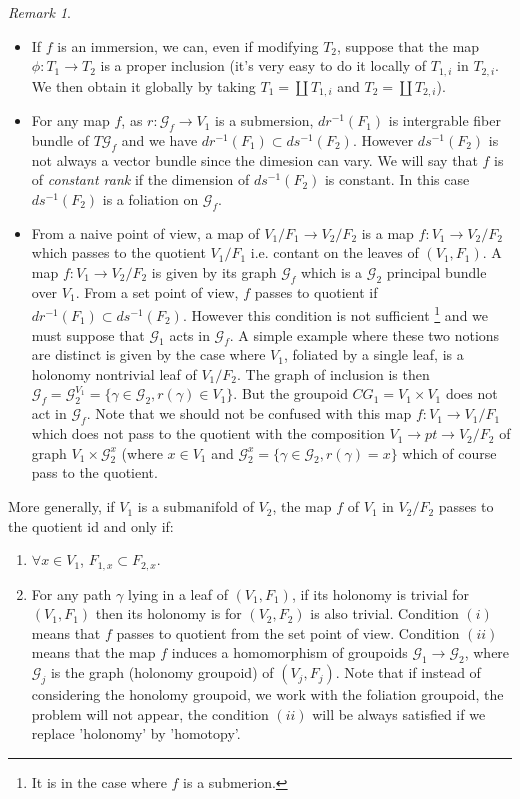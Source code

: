 \documentclass[12pt]{amsart}
\theoremstyle{definition}
\theoremstyle{remark}
\newtheorem{rem}[thm]{Remark}
\numberwithin{equation}{section}
\newcommand{\CG}{{\mathcal G}}
\begin{document}
\begin{rem}


 \begin{itemize}
     \item If $f$ is an immersion, we can, even if modifying $T_2$, suppose that the map $\phi: T_1 \to T_2$ is a proper inclusion (it's very easy to do it locally of $T_{1,i}$ in $T_{2,i}$. We then obtain it globally by taking $T_1 = \coprod T_{1,i}$ and $T_2 = \coprod T_{2,i}$).
     
     \item For any map $f$, as $r: \CG_f \to V_1$ is a submersion, $dr^{-1}(F_1)$ is intergrable fiber bundle of $T\CG_f$ and we have $dr^{-1}(F_1) \subset ds^{-1}(F_2)$. However $ds^{-1}(F_2)$ is not always a vector bundle since the dimesion can vary. We will say that $f$ is of {\it constant rank} if the dimension of $ds^{-1}(F_2)$ is constant. In this case $ds^{-1}(F_2)$ is a foliation on $\CG_f$.
     
     \item From a naive point of view, a map of $V_1/F_1 \to V_2/F_2$ is a map $f: V_1 \to V_2/F_2$ which passes to the quotient $V_1/F_1$ i.e. contant on the leaves of $(V_1, F_1)$. A map $f: V_1 \to V_2/ F_2$ is given by its graph $\CG_f$ which is a $\CG_2$ principal bundle over $V_1$. From a set point of view, $f$ passes to quotient if $dr^{-1}(F_1) \subset ds^{-1}(F_2)$. However this condition is not sufficient \footnote{It is in the case where $f$ is a submerion.} and we must suppose that $\CG_1$ acts in $\CG_f$. A simple example where these two notions are distinct is given by the case where $V_1$,  foliated by a single leaf, is a holonomy nontrivial leaf of $V_1/F_2$. The graph of inclusion is then $\CG_f = \CG_2^{V_1}= \{\gamma \in \CG_2, r(\gamma) \in V_1\} $. But the groupoid $CG_1 = V_1 \times 
     V_1$ does not act in $\CG_f$. Note that we should not be confused with this map $f: V_1 \to V_1/F_1$ which does not pass to the quotient with the composition $V_1 \to pt \to V_2/F_2$ of graph $V_1 \times \CG_2^x$ (where $x\in V_1$ and $\CG_2^x = \{\gamma \in \CG_2, r(\gamma) = x\}$ which of course pass to the quotient. \end{itemize} 
     
     More generally, if $V_1$ is a submanifold of $V_2$, the map $f$ of $V_1$ in $V_2/F_2$ passes to the quotient id and only if:
     \begin{enumerate}
         \item $\forall x \in V_1$, $F_{1,x} \subset F_{2,x}$.
         \item For any path $\gamma$ lying in a leaf of $(V_1, F_1)$, if its holonomy is trivial for $(V_1, F_1)$ then its holonomy is for $(V_2, F_2)$ is also trivial. Condition $(i)$ means that $f$ passes to quotient from the set point of view. Condition $(ii)$ means that the map $f$ induces a homomorphism of groupoids $\CG_1 \to \CG_2$, where $\CG_j$ is the graph (holonomy groupoid) of $(V_j, F_j)$. 
         Note that if instead of considering the honolomy groupoid, we work with the foliation groupoid, the problem will not appear, the condition $(ii)$ will be always satisfied if we replace 'holonomy' by 'homotopy'.
         


\end{enumerate}
\end{rem}
\end{document}
